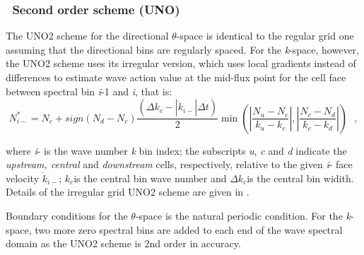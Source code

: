 \vssub
\subsubsection{~Second  order scheme (UNO)}

\noindent
The UNO2 scheme for the directional $\theta$-space is identical to the regular
grid one assuming that the directional bins are regularly spaced. For the
\emph{k}-space, however, the UNO2 scheme uses its irregular version, which
uses local gradients instead of differences to estimate wave action value at
the mid-flux point for the cell face between spectral bin \emph{i}-1 and
\emph{i}, that is:
\begin{equation}
  N_{i-}^{*}=N_{c}+sign\left(N_{d}-N_{c}\right)\frac{\left(\Delta
      k_{c}-|\dot{k}_{i-}|\Delta
      t\right)}{2}\min\left(|\frac{N_{u}-N_{c}}{k_{u}-k_{c}}|,|\frac{N_{c}-N_{d}}{k_{c}-k_{d}}|\right)
  \:\:\:,
\label{eq:UNO2irregular}
\end{equation}

\noindent
where \emph{i}- is the wave number \emph{k} bin index; the subscripts
\emph{u}, \emph{c} and \emph{d} indicate the \emph{upstream, central} and
\emph{downstream} cells, respectively, relative to the given \emph{i}- face
velocity $\dot{k}_{i-}$; $k_{c}$is the central bin wave number and $\Delta
k_{c}$is the central bin widith. Details of the irregular grid UNO2 scheme are
given in \cite{art:Li08}.

Boundary conditions for the $\theta$-space is the natural periodic
condition. For the \emph{k}-space, two more zero spectral bins are added to
each end of the wave spectral domain as the UNO2 scheme is 2nd order in
accuracy.


